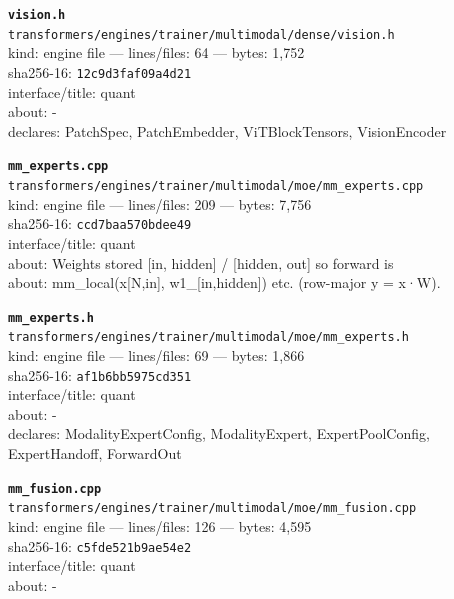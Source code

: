 \noindent\textbf{\texttt{vision.h}}\\
\texttt{transformers/engines/trainer/multimodal/dense/vision.h}\\
kind: engine file --- lines/files: 64 --- bytes: 1,752\\
sha256-16: \texttt{12c9d3faf09a4d21}\\
interface/title: quant\\
about: -\\
declares: PatchSpec, PatchEmbedder, ViTBlockTensors, VisionEncoder\\
\vspace*{6.0pt}
\newpage

\noindent\textbf{\texttt{mm\_experts.cpp}}\\
\texttt{transformers/engines/trainer/multimodal/moe/mm\_experts.cpp}\\
kind: engine file --- lines/files: 209 --- bytes: 7,756\\
sha256-16: \texttt{ccd7baa570bdee49}\\
interface/title: quant\\
about: Weights stored [in, hidden] / [hidden, out] so forward is\\
about: mm\_local(x[N,in], w1\_[in,hidden]) etc. (row-major y = x·W).\\
\vspace*{6.0pt}

\noindent\textbf{\texttt{mm\_experts.h}}\\
\texttt{transformers/engines/trainer/multimodal/moe/mm\_experts.h}\\
kind: engine file --- lines/files: 69 --- bytes: 1,866\\
sha256-16: \texttt{af1b6bb5975cd351}\\
interface/title: quant\\
about: -\\
declares: ModalityExpertConfig, ModalityExpert, ExpertPoolConfig, ExpertHandoff, ForwardOut\\
\vspace*{6.0pt}

\noindent\textbf{\texttt{mm\_fusion.cpp}}\\
\texttt{transformers/engines/trainer/multimodal/moe/mm\_fusion.cpp}\\
kind: engine file --- lines/files: 126 --- bytes: 4,595\\
sha256-16: \texttt{c5fde521b9ae54e2}\\
interface/title: quant\\
about: -\\
\vspace*{6.0pt}

